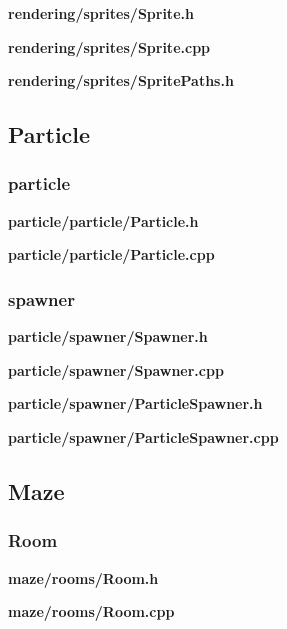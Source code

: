 \documentclass[../Main.tex]{subfiles}
\begin{document}
            \textbf{rendering/sprites/Sprite.h}
            
            \textbf{rendering/sprites/Sprite.cpp}
            

            \textbf{rendering/sprites/SpritePaths.h}
            

    \subsection{Particle}
        \subsubsection{particle}
            \textbf{particle/particle/Particle.h}
            
            \textbf{particle/particle/Particle.cpp}
            

        \subsubsection{spawner}
            \textbf{particle/spawner/Spawner.h}
            
            \textbf{particle/spawner/Spawner.cpp}
            

            \textbf{particle/spawner/ParticleSpawner.h}
            
            \textbf{particle/spawner/ParticleSpawner.cpp}
            

    \subsection{Maze}
        \subsubsection{Room}
            \textbf{maze/rooms/Room.h}
            
            \textbf{maze/rooms/Room.cpp}
            
\end{document}
